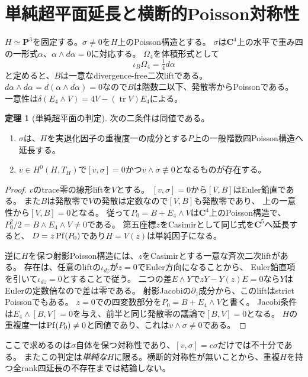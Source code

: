 \documentclass[a4paper,11pt]{ltjsarticle}
\theoremstyle{definition}
\newtheorem{theorem}{定理}[section]
\theoremstyle{definition}\newtheorem{definition}[theorem]{定義}
\theoremstyle{remark}\newtheorem{remark}[theorem]{注意}
\newcommand{\PP}{\mathbf P}\renewcommand{\AA}{\mathbf A}\newcommand{\CC}{\mathbf C}
\begin{document}
\section{単純超平面延長と横断的Poisson対称性}
$H\simeq\PP^3$を固定する。$\sigma\ne0$を$H$上のPoisson構造とする。
$\sigma$は$\CC^4$上の水平で重み四の一形式$\alpha$、$\alpha\wedge d\alpha=0$に対応する。
$\Omega_4$を体積形式として
\[
 \iota_B\Omega_4=\tfrac14d\alpha
\]
と定めると、$B$は一意なdivergence-free二次liftである。
$d\alpha\wedge d\alpha=d(\alpha\wedge d\alpha)=0$なので$B$は階数二以下、発散零からPoissonである。
一意性は$\delta(E_4\wedge V)=4V-(\operatorname{tr}V)E_4$による。

\begin{theorem}[単純超平面の判定]\label{thm:hyperplane}
次の二条件は同値である。
\begin{enumerate}
\item $\sigma$は、$H$を実退化因子の重複度一の成分とする$P$上の一般階数四Poisson構造へ延長する。
\item $v\in H^0(H,T_H)$で$[v,\sigma]=0$かつ$v\wedge\sigma\not\equiv0$となるものが存在する。
\end{enumerate}
\end{theorem}
\begin{proof}
$v$のtrace零の線形liftを$V$とする。
$[v,\sigma]=0$から$[V,B]$はEuler鉛直である。
また$B$は発散零で$V$の発散は定数なので$[V,B]$も発散零であり、
上の一意性から$[V,B]=0$となる。
従って$P_0=B+E_4\wedge V$は$\CC^4$上のPoisson構造で、
$P_0^2/2=B\wedge E_4\wedge V\ne0$である。
第五座標$z$をCasimirとして同じ式を$\CC^5$へ延長すると、
$D=z\operatorname{Pf}(P_0)$であり$H=V(z)$は単純因子になる。

逆に$H$を保つ射影Poisson構造には、$z$をCasimirとする一意な斉次二次liftがある。
存在は、任意のliftの$\iota_{dz}$が$z=0$でEuler方向になることから、
Euler鉛直項を引いて$\iota_{dz}=0$とすることで従う。
二つの差$E\wedge Y$で$zY-Y(z)E=0$なら$Y$はEulerの定数倍なので差は零である。
射影Jacobiの$\partial_z$成分から、このliftはstrict Poissonでもある。
$z=0$での四変数部分を$P_0=B+E_4\wedge V$と書く。
Jacobi条件は$E_4\wedge[B,V]=0$を与え、前半と同じ発散零の議論で$[B,V]=0$となる。
$H$の重複度一は$\operatorname{Pf}(P_0)\ne0$と同値であり、これは$v\wedge\sigma\ne0$である。
\end{proof}

ここで求めるのは$\sigma$自体を保つ対称性であり、$[v,\sigma]=c\sigma$だけでは不十分である。
またこの判定は\emph{単純な}$H$に限る。横断的対称性が無いことから、重複$H$を持つ全rank四延長の不存在までは結論しない。
\end{document}
